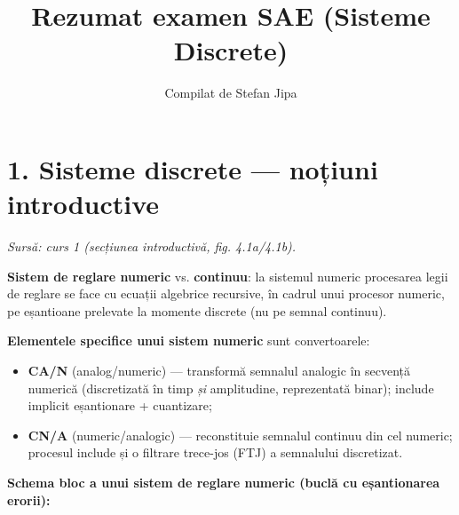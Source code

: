\documentclass[10pt,a4paper]{article}
\title{\vspace{-2cm}Rezumat examen SAE (Sisteme Discrete)}
\author{\large Compilat de Stefan Jipa}
\date{}
\newcommand{\srcnote}[1]{{\footnotesize\color{gray!55!black}\textit{Sursă: #1}}\par}
\begin{document}
\maketitle
\vspace{-1.2cm}

\section*{1. Sisteme discrete — noțiuni introductive}\label{sec:1}
\srcnote{curs 1 (secțiunea introductivă, fig. 4.1a/4.1b).}
\textbf{Sistem de reglare numeric} vs. \textbf{continuu}: la sistemul numeric procesarea legii de reglare se face cu ecuații algebrice recursive, în cadrul unui procesor numeric, pe eșantioane prelevate la momente discrete (nu pe semnal continuu).

\textbf{Elementele specifice unui sistem numeric} sunt convertoarele:
\begin{itemize}
\item \textbf{CA/N} (analog/numeric) — transformă semnalul analogic în secvență numerică (discretizată în timp \emph{și} amplitudine, reprezentată binar); include implicit eșantionare + cuantizare;
\item \textbf{CN/A} (numeric/analogic) — reconstituie semnalul continuu din cel numeric; procesul include și o filtrare trece-jos (FTJ) a semnalului discretizat.
\end{itemize}

\textbf{Schema bloc a unui sistem de reglare numeric (buclă cu eșantionarea erorii):}
\begin{center}
\end{center}
\end{document}
